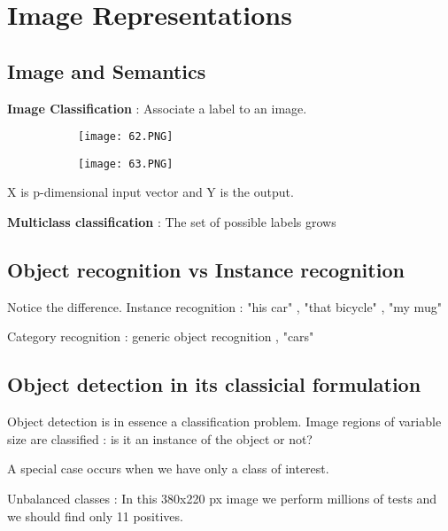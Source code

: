 \documentclass{article}
\begin{document}
\vspace{60mm}

\section{Image Representations}

\subsection{Image and Semantics}

\textbf{Image Classification} : Associate a label to an image.

\begin{figure}[ht!]
  \centering
  \begin{subfigure}[b]{0.5\linewidth}
    \texttt{[image: 62.PNG]}
  \end{subfigure}
     \begin{subfigure}[b]{0.49\textwidth}
         \centering
         \texttt{[image: 63.PNG]}
     \end{subfigure}
\end{figure}

X is p-dimensional input vector and Y is the output.

\textbf{Multiclass classification} : The set of possible labels grows

\subsection{Object recognition vs Instance recognition}

Notice the difference. Instance recognition : "his car" , "that bicycle" , "my mug"

Category recognition : generic object recognition , "cars" 

\subsection{Object detection in its classicial formulation}

Object detection is in essence a classification problem. Image regions of variable size are classified : is it an instance of the object or not?

A special case occurs when we have only a class of interest.

Unbalanced classes : In this 380x220 px image we perform millions of tests and we should find only 11 positives.
\end{document}
